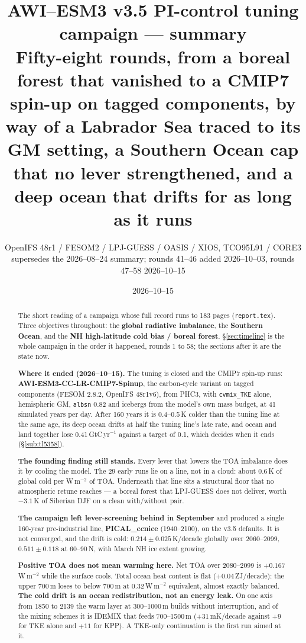 \documentclass[10pt]{article}
\title{\vspace{-1.4cm}\textbf{AWI--ESM3 v3.5 PI-control tuning campaign --- summary}\\[2pt]
\large Fifty-eight rounds, from a boreal forest that vanished to a CMIP7 spin-up on tagged
components, by way of a Labrador Sea traced to its GM setting, a Southern Ocean cap that no lever
strengthened, and a deep ocean that drifts for as long as it runs}
\author{OpenIFS 48r1 / FESOM2 / LPJ-GUESS / OASIS / XIOS, TCO95L91 / CORE3\\[1pt]
\normalsize supersedes the 2026--08--24 summary; rounds 41--46 added 2026--10--03, rounds 47--58 2026--10--15}
\date{2026--10--15}
\begin{document}
\maketitle
\vspace{-0.7cm}

\begin{abstract}\noindent
The short reading of a campaign whose full record runs to 183 pages
(\texttt{report.tex}). Three objectives throughout: the \textbf{global radiative
imbalance}, the \textbf{Southern Ocean}, and the \textbf{NH high-latitude cold bias /
boreal forest}. \S\ref{sec:timeline} is the whole campaign in the order it happened,
rounds 1 to 58; the sections after it are the state now.

\medskip\noindent\textbf{Where it ended (2026--10--15).} The tuning is closed and the CMIP7
spin-up runs: \textbf{AWI-ESM3-CC-LR-CMIP7-Spinup}, the carbon-cycle variant on tagged components
(FESOM 2.8.2, OpenIFS 48r1v6), from PHC3, with \texttt{cvmix\_TKE} alone, hemispheric GM,
\texttt{albsn} 0.82 and icebergs from the model's own mass budget, at 41 simulated years per day.
After 160 years it is 0.4--0.5\,K colder than the tuning line at the same age, its deep ocean drifts
at half the tuning line's late rate, and ocean and land together lose 0.41\,GtC\,yr$^{-1}$ against a
target of 0.1, which decides when it ends (\S\ref{sub:tl5358}).

\medskip\noindent\textbf{The founding finding still stands.} Every lever that lowers the
TOA imbalance does it by cooling the model. The 29 early runs lie on a line, not in a
cloud: about $0.6$\,K of global cold per W\,m$^{-2}$ of TOA. Underneath that line sits a
structural floor that no atmospheric retune reaches --- a boreal forest that LPJ-GUESS
does not deliver, worth $-3.1$\,K of Siberian DJF on a clean with/without pair.

\medskip\noindent\textbf{The campaign left lever-screening behind in September} and produced a
single 160-year pre-industrial line, \textbf{PICAL\_ccnice} (1940--2100), on the v3.5
defaults. It is not converged, and the drift is cold: $0.214\pm0.025$\,K/decade globally
over 2060--2099, $0.511\pm0.118$ at 60--90\,N, with March NH ice extent growing.

\medskip\noindent\textbf{Positive TOA does not mean warming here.} Net TOA over 2080--2099
is $+0.167$\,W\,m$^{-2}$ while the surface cools. Total ocean heat content is flat
($+0.04$\,ZJ/decade): the upper 700\,m loses to below 700\,m at $0.32$\,W\,m$^{-2}$
equivalent, almost exactly balanced. \textbf{The cold drift is an ocean redistribution,
not an energy leak.} On one axis from 1850 to 2139 the warm layer at 300--1000\,m builds without
interruption, and of the mixing schemes it is IDEMIX that feeds 700--1500\,m ($+31$\,mK/decade
against $+9$ for TKE alone and $+11$ for KPP). A TKE-only continuation is the first run aimed at it.


\end{abstract}
\end{document}
